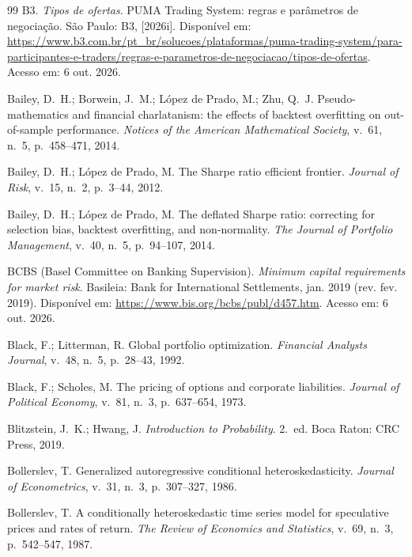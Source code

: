 \begin{thebibliography}{99}
B3. \emph{Tipos de ofertas}. PUMA Trading System: regras e parâmetros de negociação. São Paulo: B3, [2026i]. Disponível em: \url{https://www.b3.com.br/pt_br/solucoes/plataformas/puma-trading-system/para-participantes-e-traders/regras-e-parametros-de-negociacao/tipos-de-ofertas}. Acesso em: 6 out. 2026.

Bailey, D.~H.; Borwein, J.~M.; López de Prado, M.; Zhu, Q.~J. Pseudo-mathematics and financial charlatanism: the effects of backtest overfitting on out-of-sample performance. \emph{Notices of the American Mathematical Society}, v.~61, n.~5, p.~458--471, 2014.

Bailey, D.~H.; López de Prado, M. The Sharpe ratio efficient frontier. \emph{Journal of Risk}, v.~15, n.~2, p.~3--44, 2012.

Bailey, D.~H.; López de Prado, M. The deflated Sharpe ratio: correcting for selection bias, backtest overfitting, and non-normality. \emph{The Journal of Portfolio Management}, v.~40, n.~5, p.~94--107, 2014.

BCBS (Basel Committee on Banking Supervision). \emph{Minimum capital requirements for market risk}. Basileia: Bank for International Settlements, jan. 2019 (rev. fev. 2019). Disponível em: \url{https://www.bis.org/bcbs/publ/d457.htm}. Acesso em: 6 out. 2026.

Black, F.; Litterman, R. Global portfolio optimization. \emph{Financial Analysts Journal}, v.~48, n.~5, p.~28--43, 1992.

Black, F.; Scholes, M. The pricing of options and corporate liabilities. \emph{Journal of Political Economy}, v.~81, n.~3, p.~637--654, 1973.

Blitzstein, J.~K.; Hwang, J. \emph{Introduction to Probability}. 2.~ed. Boca Raton: CRC Press, 2019.

Bollerslev, T. Generalized autoregressive conditional heteroskedasticity. \emph{Journal of Econometrics}, v.~31, n.~3, p.~307--327, 1986.

Bollerslev, T. A conditionally heteroskedastic time series model for speculative prices and rates of return. \emph{The Review of Economics and Statistics}, v.~69, n.~3, p.~542--547, 1987.


\end{thebibliography}
